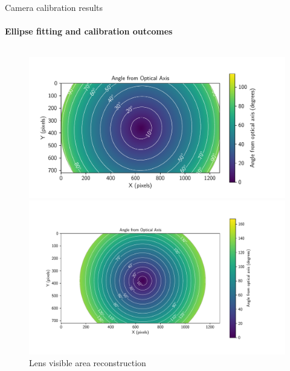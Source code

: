 \documentclass{beamer}
\begin{document}
\begin{frame}{Camera calibration results}
\framesubtitle{Ellipse fitting and calibration outcomes}

\begin{columns}[T]
    \begin{column}{0.49\textwidth}
        \vspace{-0.2cm}
        \begin{figure}
            \centering
            \includegraphics[width=\textwidth]{./fig/pgfplot/build/evk4_viz.pdf}
            
            
            \includegraphics[width=\textwidth]{./fig/pgfplot/build/viz_ent.pdf}
            
            \caption{Lens visible area reconstruction}
            \label{fig:ellipse}
        \end{figure}
    \end{column}
    

\end{columns}
\end{frame}
\end{document}
